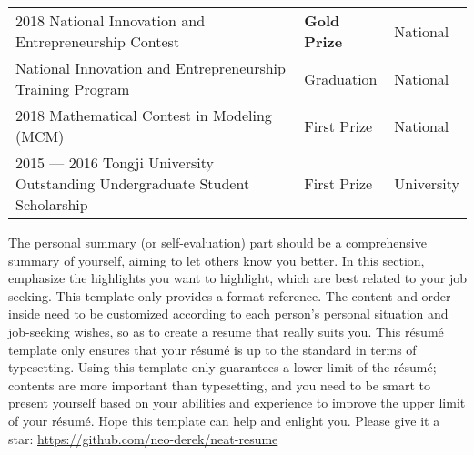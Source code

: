 \documentclass[10pt, a4paper]{article}
\begin{document}
    \setlength\tabcolsep{0pt}
    \renewcommand{\arraystretch}{1.5}
    \begin{longtable}[l]{lll}
        2018 National Innovation and Entrepreneurship Contest & \hspace*{2em}\textbf{Gold Prize} & \hspace*{2em}National\\
        
        National Innovation and Entrepreneurship Training Program & \hspace*{2em}Graduation & \hspace*{2em}National\\
        
        2018 Mathematical Contest in Modeling (MCM) & \hspace*{2em}First Prize & \hspace*{2em}National\\
        
        2015 --- 2016 Tongji University Outstanding Undergraduate Student Scholarship & \hspace*{2em}First Prize & \hspace*{2em}University\\
    \end{longtable}
    
    
    The personal summary (or self-evaluation) part should be a comprehensive summary of yourself, aiming to let others know you better. In this section, emphasize the highlights you want to highlight, which are best related to your job seeking. This template only provides a format reference. The content and order inside need to be customized according to each person's personal situation and job-seeking wishes, so as to create a resume that really suits you. This r\'esum\'e template only ensures that your r\'esum\'e is up to the standard in terms of typesetting. Using this template only guarantees a lower limit of the r\'esum\'e; contents are more important than typesetting, and you need to be smart to present yourself based on your abilities and experience to improve the upper limit of your r\'esum\'e. Hope this template can help and enlight you. Please give it a star: \href{https://github.com/neo-derek/neat-resume}{\courierprime\fontsize{10}{12}\selectfont https://github.com/neo-derek/neat-resume}
    
    
\end{document}
